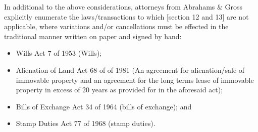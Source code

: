 \documentclass[11pt]{article}
\begin{document}
In additional to the above considerations, attorneys from Abrahams \& Gross
explicitly enumerate \cite{abgross} the laws/transactions to which [section 12 and
13]\cite{rsa02_elect_comm_trans_act} are not applicable, where variations and/or
cancellations must be effected in the traditional manner written on paper and
signed by hand:
\begin{itemize}
\item Wills Act 7 of 1953 (Wills);
\item Alienation of Land Act 68 of of 1981 (An agreement for alienation/sale of immovable property and an agreement for the long terms lease of immovable property in excess of 20 years as provided for in the aforesaid act);
\item Bills of Exchange Act 34 of 1964 (bills of exchange); and
\item Stamp Duties Act 77 of 1968 (stamp duties).
\end{itemize}

\printbibliography
\end{document}
